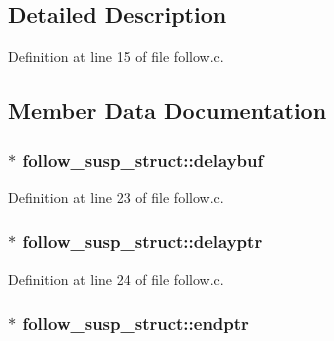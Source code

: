 \subsection{Detailed Description}


Definition at line 15 of file follow.\+c.



\subsection{Member Data Documentation}
\subsubsection[{\texorpdfstring{delaybuf}{delaybuf}}]{$\ast$ follow\+\_\+susp\+\_\+struct\+::delaybuf}\hypertarget{structfollow__susp__struct_a0a3d71a1b8092324b28f9fe60dc8329a}{}\label{structfollow__susp__struct_a0a3d71a1b8092324b28f9fe60dc8329a}


Definition at line 23 of file follow.\+c.

\subsubsection[{\texorpdfstring{delayptr}{delayptr}}]{$\ast$ follow\+\_\+susp\+\_\+struct\+::delayptr}\hypertarget{structfollow__susp__struct_ae5eb59ac43a7f67c24d5a16eb7b160ad}{}\label{structfollow__susp__struct_ae5eb59ac43a7f67c24d5a16eb7b160ad}


Definition at line 24 of file follow.\+c.

\subsubsection[{\texorpdfstring{endptr}{endptr}}]{$\ast$ follow\+\_\+susp\+\_\+struct\+::endptr}\hypertarget{structfollow__susp__struct_ad76937ce8ce051fb46e62a930ccdd22f}{}\label{structfollow__susp__struct_ad76937ce8ce051fb46e62a930ccdd22f}


